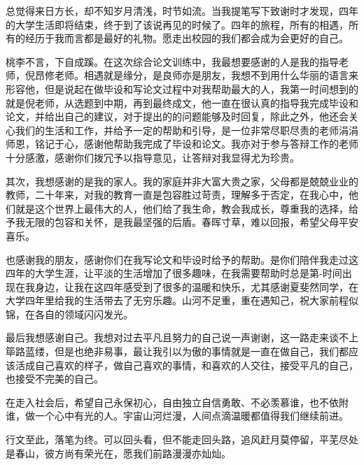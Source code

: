 
\begin{acknowledgements}
总觉得来日方长，却不知岁月清浅，时节如流。当我提笔写下致谢时才发现，四年的大学生活即将结束，终于到了该说再见的时候了。四年的旅程，所有的相遇，所有的经历于我而言都是最好的礼物。愿走出校园的我们都会成为会更好的自己。

桃李不言，下自成蹊。在这次综合论文训练中，我最想要感谢的人是我的指导老师，倪昂修老师。相遇就是缘分，是良师亦是朋友，我想不到用什么华丽的语言来形容他，但是说起在做毕设和写论文过程中对我帮助最大的人，我第一时间想到的就是倪老师，从选题到中期，再到最终成文，他一直在很认真的指导我完成毕设和论文，并给出自己的建议，对于提出的的问题能够及时回复，除此之外，他还会关心我们的生活和工作，并给予一定的帮助和引导，是一位非常尽职尽责的老师涓涓师恩，铭记于心，感谢他帮助我完成了毕设和论文。我亦对于参与答辩工作的老师十分感激，感谢你们拨冗予以指导意见，让答辩对我显得尤为珍贵。

其次，我想感谢的是我的家人。我的家庭并非大富大贵之家，父母都是兢兢业业的教师，二十年来，对我的教育一直是包容胜过苛责，理解多于否定，在我心中，他们就是这个世界上最伟大的人，他们给了我生命，教会我成长，尊重我的选择，给予我无限的包容和关怀，是我最坚强的后盾。春晖寸草，难以回报，希望父母平安喜乐。

也感谢我的朋友，感谢你们在我写论文和毕设时给予的帮助。是你们陪伴我走过这四年的大学生涯，让平淡的生活增加了很多趣味，在我需要帮助时总是第-时间出现在我身边，让我在这四年感受到了很多的温暖和快乐，尤其感谢夏斐然同学，在大学四年里给我的生活带去了无穷乐趣。山河不足重，重在遇知己，祝大家前程似锦，在各自的领域闪闪发光。

最后我想感谢自己。我想对过去平凡且努力的自己说一声谢谢，这一路走来谈不上筚路蓝缕，但是也绝非易事，最让我引以为傲的事情就是一直在做自己，我们都应该活成自己喜欢的样子，做自己喜欢的事情，和喜欢的人交往，接受平凡的自己，也接受不完美的自己。

在走入社会后，希望自己永保初心，自由独立自信勇敢、不必羡慕谁，也不依附谁，做一个心中有光的人。宇宙山河烂漫，人间点滴温暖都值得我们继续前进。

行文至此，落笔为终。可以回头看，但不能走回头路，追风赶月莫停留，平芜尽处是春山，彼方尚有荣光在，愿我们前路漫漫亦灿灿。

\end{acknowledgements}
